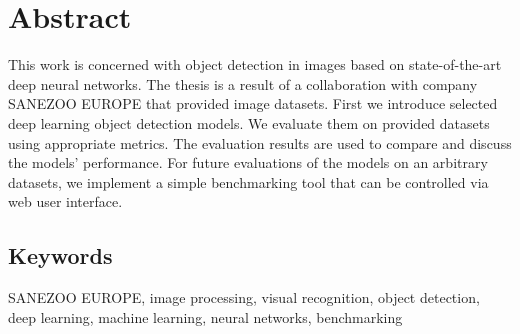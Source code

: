 \chapter*{Abstract}
\noindent
This work is concerned with object detection in images based on state-of-the-art
deep neural networks. The thesis is a result of a collaboration with company
SANEZOO EUROPE that provided image datasets. First we introduce selected deep
learning object detection models. We evaluate them on provided datasets using
appropriate metrics. The evaluation results are used to compare and discuss the
models' performance. For future evaluations of the models on an arbitrary
datasets, we implement a simple benchmarking tool that can be controlled via
web user interface.

\section*{Keywords}
\noindent
SANEZOO EUROPE, image processing, visual recognition, object detection, deep
learning, machine learning, neural networks, benchmarking
